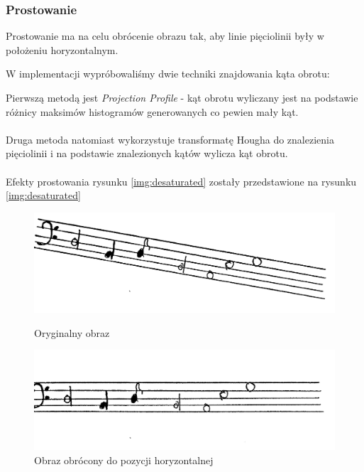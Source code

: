 \documentclass[12pt, letterpaper]{article}
\begin{document}
\subsubsection{Prostowanie}
\label{subsec:rotation}

Prostowanie ma na celu obrócenie obrazu tak, aby linie pięciolinii
były w położeniu horyzontalnym.

W implementacji wypróbowaliśmy dwie techniki znajdowania kąta obrotu:

Pierwszą metodą jest \textit{Projection Profile} -
kąt obrotu wyliczany jest na podstawie różnicy maksimów
histogramów generowanych co pewien mały kąt.
\\
\\
Druga metoda natomiast wykorzystuje transformatę Hougha
do znalezienia pięciolinii i na podstawie znalezionych
kątów wylicza kąt obrotu.
\\
\\
Efekty prostowania rysunku \ref{img:desaturated} zostały przedstawione na
rysunku \ref{img:desaturated}

\begin{figure}
    \centering
    \includegraphics[width = \imagewidth]{3.1_binarized}
    \caption[Rotated]{Oryginalny obraz}
    \label{img:rotated}
    \includegraphics[width = \imagewidth]{3.2_straightened}
    \caption[Straightened]{Obraz obrócony do pozycji horyzontalnej}
    \label{img:straightened}
\end{figure}
\end{document}
